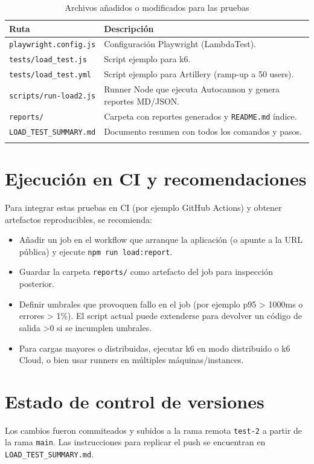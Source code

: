 \documentclass[12pt, a4paper]{article}
\begin{document}
\begin{longtable}{p{} p{}}
\toprule
\textbf{Ruta} & \textbf{Descripción} \\
\midrule
\endhead
\texttt{playwright.config.js} & Configuración Playwright (LambdaTest). \\
\texttt{tests/load_test.js} & Script ejemplo para k6. \\
\texttt{tests/load_test.yml} & Script ejemplo para Artillery (ramp-up a 50 users). \\
\texttt{scripts/run-load2.js} & Runner Node que ejecuta Autocannon y genera reportes MD/JSON. \\
\texttt{reports/} & Carpeta con reportes generados y \texttt{README.md} índice. \\
\texttt{LOAD_TEST_SUMMARY.md} & Documento resumen con todos los comandos y pasos. \\
\bottomrule
\caption{Archivos añadidos o modificados para las pruebas}
\end{longtable}

\section{Ejecución en CI y recomendaciones}

Para integrar estas pruebas en CI (por ejemplo GitHub Actions) y obtener artefactos reproducibles, se recomienda:

\begin{itemize}
  \item Añadir un job en el workflow que arranque la aplicación (o apunte a la URL pública) y ejecute \texttt{npm run load:report}.
  \item Guardar la carpeta \texttt{reports/} como artefacto del job para inspección posterior.
  \item Definir umbrales que provoquen fallo en el job (por ejemplo p95 > 1000ms o errores > 1\%). El script actual puede extenderse para devolver un código de salida >0 si se incumplen umbrales.
  \item Para cargas mayores o distribuidas, ejecutar k6 en modo distribuido o k6 Cloud, o bien usar runners en múltiples máquinas/instances.
\end{itemize}

\section{Estado de control de versiones}

Los cambios fueron commiteados y subidos a la rama remota \texttt{test-2} a partir de la rama \texttt{main}. Las instrucciones para replicar el push se encuentran en \texttt{LOAD_TEST_SUMMARY.md}.
\end{document}
